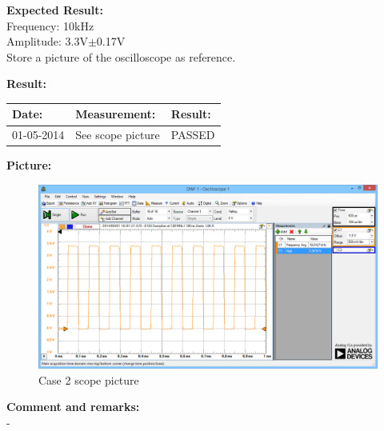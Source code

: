 \begin{figure}[H]
	\centering
\end{figure}

\textbf{Expected Result:}\\
Frequency: 10kHz\\
Amplitude: 3.3V$\pm$0.17V\\
Store a picture of the oscilloscope as reference.


\textbf{Result:}
\begin{table}[H]
\centering
\begin{tabular}{|p{2cm}|p{3cm}|p{2cm}|}\hline
\textbf{Date:} & \textbf{Measurement:} & \textbf{Result:} \\ \hline
01-05-2014 & See scope picture & PASSED \\ \hline
\end{tabular}
\end{table}
\textbf{Picture:}
\begin{figure}[H]
\centering
\includegraphics[width=.8\textwidth]{billeder/SN_Case2_osc_picture}
\caption{Case 2 scope picture}
\end{figure}
\textbf{Comment and remarks:}\\
-\\


